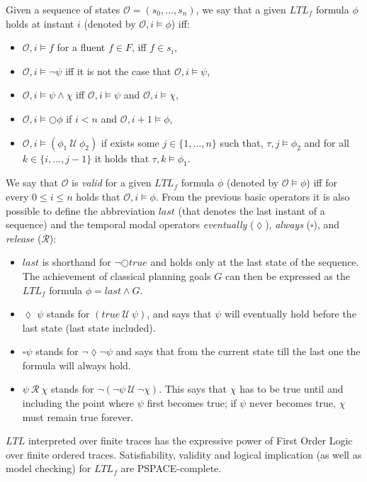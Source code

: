 \documentclass[3p,times]{elsarticle}
\begin{document}
Given a sequence of states $\mathcal{O}=(s_0,\ldots, s_n)$, we say that a given $LTL_f$ formula $\phi$ holds at instant $i$ (denoted by $\mathcal{O}, i\models\phi$) iff:
\begin{itemize}
\item $\mathcal{O}, i\models f$ for a fluent $f\in F$, iff $f\in s_i$,
\item $\mathcal{O}, i\models \neg\psi$ iff it is not the case that $\mathcal{O}, i\models\psi$,
\item $\mathcal{O}, i\models \psi\wedge\chi$ iff $\mathcal{O}, i\models\psi$ and $\mathcal{O}, i\models\chi$,
\item $\mathcal{O}, i\models \bigcirc\phi$ if $i<n$ and $\mathcal{O}, i+1\models\phi$,
\item $\mathcal{O}, i\models (\phi_1\ {\mathcal U}\ \phi_2)$ if exists some $j\in\{1,\ldots,n\}$ such that, $\tau, j\models \phi_2$ and for all $k\in\{i,\ldots,j-1\}$ it holds that $\tau, k\models \phi_1$.
\end{itemize}
We say that $\mathcal{O}$ is {\em valid} for a given $LTL_f$ formula $\phi$ (denoted by $\mathcal{O}\models\phi$) iff for every {\small $0\leq i\leq n$} holds that $\mathcal{O}, i\models\phi$. From the previous basic operators it is also possible to define the abbreviation $last$ (that denotes the last instant of a sequence) and the temporal modal operators {\em eventually} ($\lozenge$), {\em always} ($\square$), and {\em release} (${\mathcal R}$):
\begin{itemize}
\item $last$ is shorthand for $\neg\bigcirc true$ and holds only at the last state of the sequence. The achievement of classical planning goals $G$ can then be expressed as the $LTL_f$ formula $\phi=last\wedge G$.
\item $\lozenge$ $\psi$ stands for $(true\ {\mathcal U}\ \psi)$, and says that $\psi$ will eventually hold before the last state (last state included).
\item $\square\psi$ stands for $\neg \lozenge \neg\psi$ and says that from the current state till the last one the formula will always hold.
\item $\psi\ {\mathcal R}\ \chi$ stands for $\neg(\neg\psi\ {\mathcal U}\ \neg\chi)$. This says that $\chi$ has to be true until and including the point where $\psi$ first becomes true; if $\psi$ never becomes true, $\chi$ must remain true forever.
\end{itemize}

$LTL$ interpreted over finite traces has the expressive power of First Order Logic over finite ordered traces. Satisfiability, validity and logical implication (as well as model checking) for $LTL_f$ are PSPACE-complete.
\end{document}

